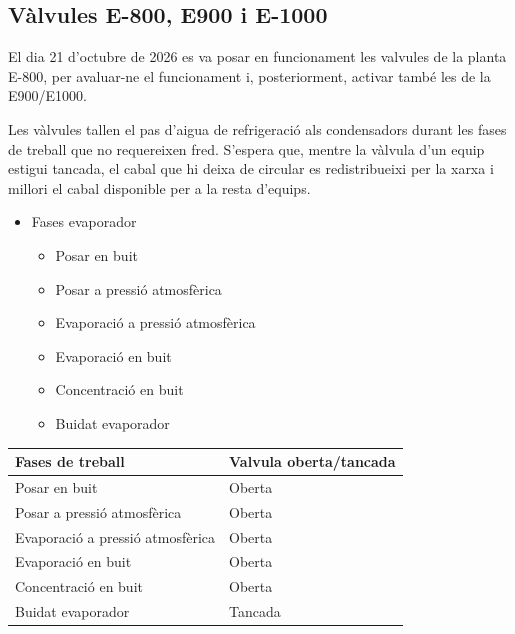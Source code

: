 \documentclass[
  paper=a4,
  oneside  ,captions=tableheading
]{scrartcl}
\newcounter{none}
\providecommand{\tightlist}{%
  \setlength{\itemsep}{0pt}\setlength{\parskip}{0pt}}
\begin{document}
\subsection{Vàlvules E-800, E900 i
E-1000}\label{vuxe0lvules-e-800-e900-i-e-1000}

El dia 21 d'octubre de 2026 es va posar en funcionament les valvules de
la planta E-800, per avaluar-ne el funcionament i, posteriorment,
activar també les de la E900/E1000.

Les vàlvules tallen el pas d'aigua de refrigeració als condensadors
durant les fases de treball que no requereixen fred. S'espera que,
mentre la vàlvula d'un equip estigui tancada, el cabal que hi deixa de
circular es redistribueixi per la xarxa i millori el cabal disponible
per a la resta d'equips.

\begin{itemize}
\tightlist
\item
  Fases evaporador

  \begin{itemize}
  \tightlist
  \item
    Posar en buit
  \item
    Posar a pressió atmosfèrica
  \item
    Evaporació a pressió atmosfèrica
  \item
    Evaporació en buit
  \item
    Concentració en buit
  \item
    Buidat evaporador
  \end{itemize}
\end{itemize}

{\def\LTcaptype{none} %
\begin{longtable}[]{@{}ll@{}}
\toprule\noalign{}
Fases de treball & Valvula oberta/tancada \\
\midrule\noalign{}
\endhead
\bottomrule\noalign{}
\endlastfoot
Posar en buit & Oberta \\
Posar a pressió atmosfèrica & Oberta \\
Evaporació a pressió atmosfèrica & Oberta \\
Evaporació en buit & Oberta \\
Concentració en buit & Oberta \\
Buidat evaporador & Tancada \\
\end{longtable}
}
\end{document}
